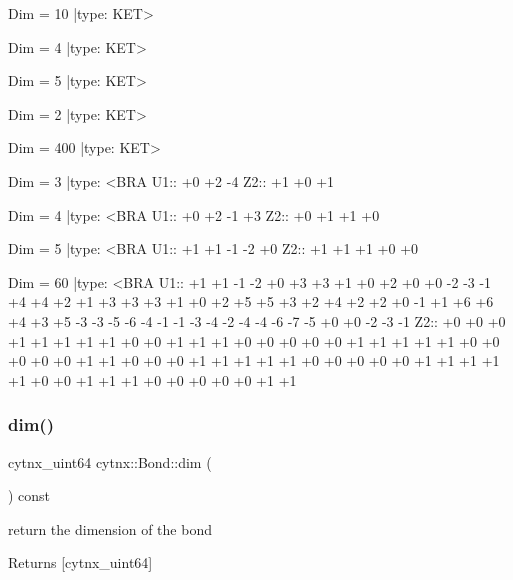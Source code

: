 \begin{DoxyVerbInclude}
Dim = 10 |type: KET>     

Dim = 4 |type: KET>     

Dim = 5 |type: KET>     

Dim = 2 |type: KET>     

Dim = 400 |type: KET>     

Dim = 3 |type: <BRA     
 U1::  +0 +2 -4
 Z2::  +1 +0 +1

Dim = 4 |type: <BRA     
 U1::  +0 +2 -1 +3
 Z2::  +0 +1 +1 +0

Dim = 5 |type: <BRA     
 U1::  +1 +1 -1 -2 +0
 Z2::  +1 +1 +1 +0 +0

Dim = 60 |type: <BRA     
 U1::  +1 +1 -1 -2 +0 +3 +3 +1 +0 +2 +0 +0 -2 -3 -1 +4 +4 +2 +1 +3 +3 +3 +1 +0 +2 +5 +5 +3 +2 +4 +2 +2 +0 -1 +1 +6 +6 +4 +3 +5 -3 -3 -5 -6 -4 -1 -1 -3 -4 -2 -4 -4 -6 -7 -5 +0 +0 -2 -3 -1
 Z2::  +0 +0 +0 +1 +1 +1 +1 +1 +0 +0 +1 +1 +1 +0 +0 +0 +0 +0 +1 +1 +1 +1 +1 +0 +0 +0 +0 +0 +1 +1 +0 +0 +0 +1 +1 +1 +1 +1 +0 +0 +0 +0 +0 +1 +1 +1 +1 +1 +0 +0 +1 +1 +1 +0 +0 +0 +0 +0 +1 +1










\end{DoxyVerbInclude}
 \mbox{\label{classcytnx_1_1Bond_aa072647e03a4c797479445bd41b9eacf}} 
\subsubsection{\texorpdfstring{dim()}{dim()}}
{\footnotesize\ttfamily cytnx\+\_\+uint64 cytnx\+::\+Bond\+::dim (\begin{DoxyParamCaption}{ }\end{DoxyParamCaption}) const\hspace{0.3cm}{\ttfamily [inline]}}



return the dimension of the bond 

\begin{DoxyReturn}{Returns}
\mbox{[}cytnx\+\_\+uint64\mbox{]} 
\end{DoxyReturn}
\mbox{\label{classcytnx_1_1Bond_a707a803fa98fb6a87b5f3c3b3000509f}} 
